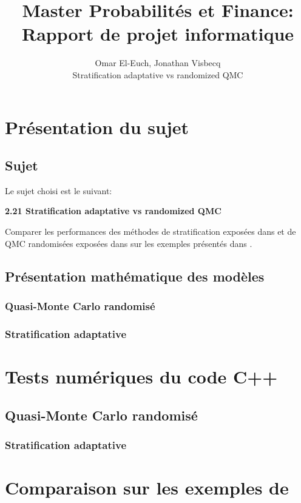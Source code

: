 \documentclass[12pt,a4paper]{report}
\author{Omar El-Euch, Jonathan Visbecq \\ Stratification adaptative vs randomized QMC}
\title{\centering Master Probabilités et Finance: \\ \textbf{Rapport de projet informatique}}
\begin{document}
\maketitle

\tableofcontents

\chapter{Présentation du sujet}

\section{Sujet}
Le sujet choisi est le suivant:
\begin{center}
\bf
	2.21 Stratification adaptative vs randomized QMC
\end{center}


Comparer les performances des méthodes de stratification exposées dans \cite{EJ08} et de QMC randomisées exposées dans \cite{Tu04} sur les exemples présentés dans \cite{EJ08}.


\section{Présentation mathématique des modèles}

\subsection{Quasi-Monte Carlo randomisé}

\subsection{Stratification adaptative}

\chapter{Tests numériques du code C++}

\section{Quasi-Monte Carlo randomisé}

\subsection{Stratification adaptative}

\chapter{Comparaison sur les exemples de \cite{EJ08}}
\end{document}
